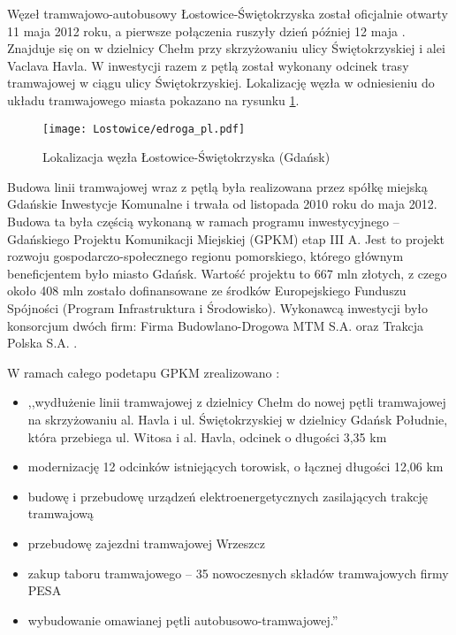 \documentclass[twoside,12pt]{article}
\begin{document}
	Węzeł tramwajowo-autobusowy Łostowice-Świętokrzyska został oficjalnie otwarty 11 maja 2012 roku, a pierwsze połączenia ruszyły dzień później 12 maja \cite{gazeta_gdansk}. Znajduje się on w dzielnicy Chełm przy skrzyżowaniu ulicy Świętokrzyskiej i alei Vaclava Havla. W inwestycji razem z pętlą został wykonany odcinek trasy tramwajowej w ciągu ulicy Świętokrzyskiej. Lokalizację węzła w odniesieniu do układu tramwajowego miasta pokazano na rysunku \ref{lostowice1}.
	
	\begin{figure}[H]
		\centering
		\texttt{[image: Lostowice/edroga\_pl.pdf]}\\
		\caption{Lokalizacja węzła Łostowice-Świętokrzyska (Gdańsk)}
		\label{lostowice1}
	\end{figure}
	
	Budowa linii tramwajowej wraz z pętlą była realizowana przez spółkę miejską Gdańskie Inwestycje Komunalne i trwała od listopada 2010 roku do maja 2012. Budowa ta była częścią wykonaną w ramach programu inwestycyjnego -- Gdańskiego Projektu Komunikacji Miejskiej (GPKM) etap III A. Jest to projekt rozwoju gospodarczo-społecznego regionu pomorskiego, którego głównym beneficjentem było miasto Gdańsk. Wartość projektu to 667 mln złotych, z czego około 408 mln zostało dofinansowane ze środków Europejskiego Funduszu Spójności (Program Infrastruktura i Środowisko). Wykonawcą inwestycji było konsorcjum dwóch firm: Firma Budowlano-Drogowa MTM S.A. oraz Trakcja Polska S.A. \cite{portal_gdansk}. 
	
	\begin{samepage}
	W ramach całego podetapu GPKM zrealizowano \cite{portal_gdansk}:
	\begin{itemize}\setlength{\itemsep}{0em}
	\item ,,wydłużenie linii tramwajowej z dzielnicy Chełm do nowej pętli tramwajowej na skrzyżowaniu al. Havla i ul. Świętokrzyskiej w dzielnicy Gdańsk Południe, która przebiega ul. Witosa i al. Havla, odcinek o długości 3,35 km
	\item modernizację 12 odcinków istniejących torowisk, o łącznej długości 12,06 km
	\item budowę i przebudowę urządzeń elektroenergetycznych zasilających trakcję tramwajową
	\item przebudowę zajezdni tramwajowej Wrzeszcz
	\item zakup taboru tramwajowego – 35 nowoczesnych składów tramwajowych firmy PESA
	\item wybudowanie omawianej pętli autobusowo-tramwajowej.'' \cite{portal_gdansk}
	\end{itemize}\end{samepage}
	
\end{document}
